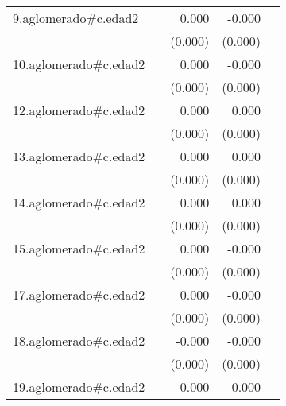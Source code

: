 {\begin{longtable}{l*{4}{D{.}{.}{-1}}}
\addlinespace
9.aglomerado#c.edad2&                     &       0.000         &      -0.000         &                     \\
            &                     &     (0.000)         &     (0.000)         &                     \\
\addlinespace
10.aglomerado#c.edad2&                     &       0.000         &      -0.000         &                     \\
            &                     &     (0.000)         &     (0.000)         &                     \\
\addlinespace
12.aglomerado#c.edad2&                     &       0.000\sym{*}  &       0.000         &                     \\
            &                     &     (0.000)         &     (0.000)         &                     \\
\addlinespace
13.aglomerado#c.edad2&                     &       0.000\sym{***}&       0.000\sym{**} &                     \\
            &                     &     (0.000)         &     (0.000)         &                     \\
\addlinespace
14.aglomerado#c.edad2&                     &       0.000\sym{***}&       0.000\sym{*}  &                     \\
            &                     &     (0.000)         &     (0.000)         &                     \\
\addlinespace
15.aglomerado#c.edad2&                     &       0.000         &      -0.000         &                     \\
            &                     &     (0.000)         &     (0.000)         &                     \\
\addlinespace
17.aglomerado#c.edad2&                     &       0.000\sym{*}  &      -0.000         &                     \\
            &                     &     (0.000)         &     (0.000)         &                     \\
\addlinespace
18.aglomerado#c.edad2&                     &      -0.000         &      -0.000\sym{*}  &                     \\
            &                     &     (0.000)         &     (0.000)         &                     \\
\addlinespace
19.aglomerado#c.edad2&                     &       0.000         &       0.000         &                     \\

\end{longtable}}
